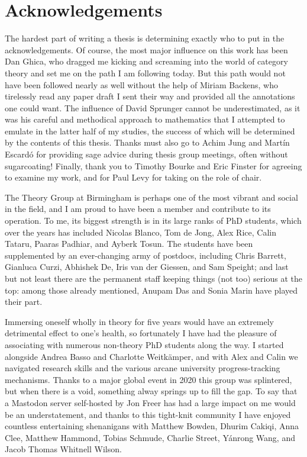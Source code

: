 \chapter{Acknowledgements}\label{chap:acknowledgements}

The hardest part of writing a thesis is determining exactly who to put in the
acknowledgements.
Of course, the most major influence on this work has been Dan Ghica, who dragged
me kicking and screaming into the world of category theory and set me on the
path I am following today.
But this path would not have been followed nearly as well without the help of
Miriam Backens, who tirelessly read any paper draft I sent their way and
provided all the annotations one could want.
The influence of David Sprunger cannot be underestimated, as it was his
careful and methodical approach to mathematics that I attempted to emulate in
the latter half of my studies, the success of which will be determined by the
contents of this thesis.
Thanks must also go to Achim Jung and Martín Escardó for providing sage advice
during thesis group meetings, often without sugarcoating!
Finally, thank you to Timothy Bourke and Eric Finster for agreeing to examine
my work, and for Paul Levy for taking on the role of chair.

The Theory Group at Birmingham is perhaps one of the most vibrant and social
in the field, and I am proud to have been a member and contribute to its
operation.
To me, its biggest strength is in its large ranks of PhD students, which over
the years has included Nicolas Blanco, Tom de Jong, Alex Rice, Calin Tataru,
Paaras Padhiar, and Ayberk Tosun.
The students have been supplemented by an ever-changing army of postdocs,
including Chris Barrett, Gianluca Curzi, Abhishek De, Iris van der Giessen, and
Sam Speight; and last but not least there are the permanent staff keeping things
(not too) serious at the top: among those already mentioned, Anupam Das and
Sonia Marin have played their part.

Immersing oneself wholly in theory for five years would have an extremely
detrimental effect to one's health, so fortunately I have had the pleasure of
associating with numerous non-theory PhD students along the way.
I started alongside Andrea Basso and Charlotte Weitkämper, and with Alex and
Calin we navigated research skills and the various arcane university
progress-tracking mechanisms.
Thanks to a major global event in 2020 this group was splintered, but when
there is a void, something alway springs up to fill the gap.
To say that a Mastodon server self-hosted by Jon Freer has had a large impact on
me would be an understatement, and thanks to this tight-knit community I have
enjoyed countless entertaining shenanigans with Matthew Bowden, Dhurim Cakiqi,
Anna Clee, Matthew Hammond, Tobias Schmude, Charlie Street, Yánrong Wang, and
Jacob Thomas Whitnell Wilson.

